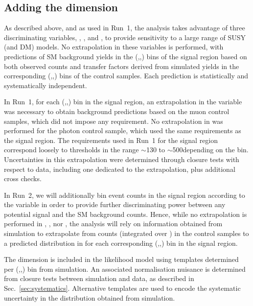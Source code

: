 \subsection{Adding the \texorpdfstring{\mht}{MHT} dimension}
\label{sec:had-shape}

As described above, and as used in Run~1, the analysis takes advantage
of three discriminating variables, \njet, \nb, and \HT, to provide
sensitivity to a large range of SUSY (and DM) models. No extrapolation
in these variables is performed, with predictions of SM background
yields in the (\njet,\nb,\HT) bins of the signal region based on both
observed counts and transfer factors derived from simulated yields in
the corresponding (\njet,\nb,\HT) bins of the control samples. Each
prediction is statistically and systematically independent.

In Run~1, for each (\njet,\nb,\HT) bin in the signal region, an
extrapolation in the variable \alphat was necessary to obtain
background predictions based on the muon control samples, which did
not impose any \alphat requirement. No extrapolation in \alphat was
performed for the photon control sample, which used the same \alphat
requirements as the signal region. The \alphat requirements used in
Run~1 for the signal region correspond loosely to \mht thresholds in
the range $\sim$130 to $\sim$500\gev depending on the \HT
bin. Uncertainties in this extrapolation were determined through
closure tests with respect to data, including one dedicated to the
\alphat extrapolation, plus additional cross checks.

In Run~2, we will additionally bin event counts in the signal region
according to the variable \mht in order to provide further
discriminating power between any potential signal and the SM
background counts. Hence, while no extrapolation is performed in
\njet, \nb, nor \HT, the analysis will rely on information obtained
from simulation to extrapolate from counts (integrated over \mht) in
the control samples to a predicted distribution in \mht for each
corresponding (\njet,\nb,\HT) bin in the signal region.

The \mht dimension is included in the likelihood model using templates
determined per (\njet,\nb,\HT) bin from simulation. An associated
normalisation nuisance is determined from closure tests between
simulation and data, as described in
Sec.~\ref{sec:systematics}. Alternative templates are used to encode
the systematic uncertainty in the \mht distribution obtained from
simulation. 

